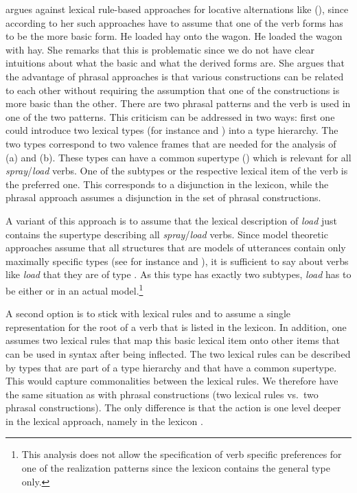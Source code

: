 \begin{exe}
\begin{xlist}[iv.]
\begin{exe}
\begin{xlist}[iv.]
\citet[]{Goldberg95a} argues against lexical rule-based approaches for locative
alternations like (), since according to her such approaches have to assume that one of the verb forms has to be the more
basic form.
\eal
\ex He loaded hay onto the wagon.
\ex He loaded the wagon with hay.
\zl
She remarks that this is problematic since we do not have clear intuitions about what the basic and
what the derived forms are. She argues that the advantage of phrasal approaches is that various
constructions can be related to each other without requiring the assumption that one of the
constructions is more basic than the other. There are two phrasal patterns and the verb is used in
one of the two patterns. This criticism can be addressed in two ways: first one could introduce two
lexical types (for instance  and ) into a type hierarchy. The two
types correspond to two valence frames that are needed for the analysis of (a) and
(b). These types can have a common supertype () which is relevant for all
\emph{spray}/\emph{load} verbs. One of the subtypes or the respective lexical item of the verb is
the preferred one. This corresponds to a disjunction in the lexicon, while the phrasal approach
assumes a disjunction in the set of phrasal constructions. 

A variant of this approach is to assume that the lexical description of \emph{load} just contains
the supertype describing all \emph{spray}/\emph{load} verbs. Since model theoretic approaches
assume that all structures that are models of utterances contain only maximally specific types (see
for instance  and ), it is sufficient to say about verbs like
\emph{load} that they are of type . As this type has exactly two subtypes,
\emph{load} has to be either  or  in an actual model.\footnote{%
  This analysis does not allow the specification of verb specific preferences for one of the realization
  patterns since the lexicon contains the general type only.
}

A second option is to stick with lexical rules and to assume a single representation for the root of
a verb that is listed in the lexicon. In addition, one assumes two lexical rules that map this basic
lexical item onto other items that can be used in syntax after being inflected. The two lexical
rules can be described by types that are part of a type hierarchy and that have a common
supertype. This would capture commonalities between the lexical rules. We therefore have the same
situation as with phrasal constructions (two lexical rules vs.\ two phrasal constructions). The only
difference is that the action is one level deeper in the lexical approach, namely in the lexicon \citep[--406]{Mueller2002b}. 


\end{xlist}
\end{exe}
\end{xlist}
\end{exe}
